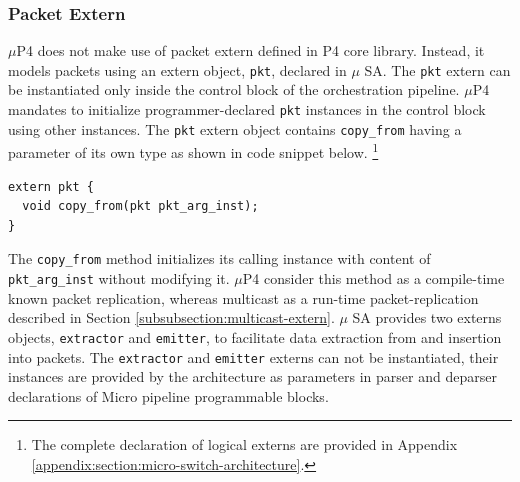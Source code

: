 \subsubsection{Packet Extern}
$\mu$P4 does not make use of packet extern defined in P4 core library.
Instead, it models packets using an extern object, \texttt{pkt}, declared in $\mu$ SA.
The \texttt{pkt} extern can be instantiated only inside the control block of the orchestration pipeline.
$\mu$P4 mandates to initialize programmer-declared \texttt{pkt} instances in the control block using other instances.
The \texttt{pkt} extern object contains \texttt{copy\_from} having a parameter of its own type as shown in code snippet below. \footnote{The complete declaration of logical externs are provided in Appendix \ref{appendix:section:micro-switch-architecture}.}
\begin{lstlisting}[frame=none]
extern pkt {
  void copy_from(pkt pkt_arg_inst);
}
\end{lstlisting}
The \texttt{copy\_from} method initializes its calling instance with content of \texttt{pkt\_arg\_inst} without modifying it.
$\mu$P4 consider this method as a compile-time known packet replication, whereas multicast as a run-time packet-replication described in Section \ref{subsubsection:multicast-extern}.
$\mu$ SA provides two externs objects, \texttt{extractor} and \texttt{emitter}, to facilitate data extraction from and insertion into packets.
The \texttt{extractor} and \texttt{emitter} externs can not be instantiated, their instances are provided by the architecture as parameters in parser and deparser declarations of Micro pipeline programmable blocks. 



